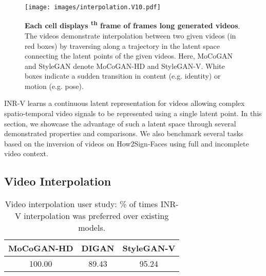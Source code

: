 \documentclass[10pt]{article} \usepackage[accepted]{tmlr}
\begin{document}
\begin{figure}
  \centering
  \texttt{[image: images/interpolation.V10.pdf]}
    \caption{\textbf{Each cell displays \textsuperscript{th} frame of  frames long generated videos}. The videos demonstrate interpolation between two given videos (in red boxes) by traversing along a trajectory in the latent space connecting the latent points of the given videos. Here, MoCoGAN and StyleGAN denote MoCoGAN-HD and StyleGAN-V. White boxes indicate a sudden transition in content (e.g. identity) or motion (e.g. pose).
    }
  \label{fig:interpolation}
\end{figure}

INR-V learns a continuous latent representation for videos allowing complex spatio-temporal video signals to be represented using a single latent point. In this section, we showcase the advantage of such a latent space through several demonstrated properties and comparisons. We also benchmark several tasks based on the inversion of  videos on How2Sign-Faces using full and incomplete video context. 

\subsection{Video Interpolation}
\label{sec:video-interpolation}

\begin{wraptable}[8]{R}{5.5cm}
\vspace{-5pt}
\centering
\begin{adjustbox}{max width=\linewidth}
\begin{tabular}{ccc}
\toprule  
MoCoGAN-HD & DIGAN & StyleGAN-V
\\ \midrule
100.00 & 89.43 & 95.24\\
\bottomrule
\end{tabular}
\end{adjustbox}
\caption{\small Video interpolation user study: \% of times INR-V interpolation was preferred over existing models.}
\label{tab:user-study-interpolation}

\end{wraptable}
\end{document}
